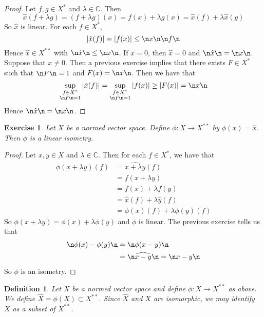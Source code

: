 \documentclass[12pt]{amsart}
\newtheorem{defn}[thm]{Definition}
\newtheorem{ex}[thm]{Exercise}
\newcommand{\lam}{\lambda}
\newcommand{\C}{\mathbb{C}}
\begin{document}
\begin{proof}
	Let $f,g \in X^*$ and $\lam \in \C$. Then $$\hat{x}(f+\lam g) = (f+ \lam g)(x) = f(x) + \lam g(x) = \hat{x}(f) + \lam \hat{x}(g)$$
	So $\hat{x}$ is linear. For each $f \in X^*$, $$\vert \hat{x}(f) \vert = \vert f(x) \vert \leq \n x \n \n f \n $$ Hence $\hat{x} \in X^{**}$ with $\n \hat{x} \n \leq \n x \n$. If $x=0$, then $\hat{x} = 0$ and $\n \hat{x} \n = \n x \n$. Suppose that $x \neq 0$. Then a previous exercise implies that there exists $F \in X^*$ such that $\n F \n =1$ and $F(x) = \n x \n$. Then we have that $$\sup_{\substack{f \in X^* \\ \n f \n = 1 } } \vert \hat{x}(f) \vert  = \sup_{\substack{f \in X^* \\ \n f \n = 1 }}  \vert f(x) \vert \geq \vert F(x) \vert = \n x \n$$
	Hence $\n \hat{x} \n = \n x \n$.
\end{proof}


\begin{ex}
	Let $X$ be a normed vector space. Define $\phi : X \rightarrow X^{**}$ by $\phi(x) = \hat{x}$. Then $\phi$ is a linear isometry. 
\end{ex}

\begin{proof}
	Let $x,y \in X$ and $\lam \in \C$. Then for each $f \in X^*$, we have that 
	\begin{align*}
		\phi(x+ \lam y)(f) 
		&= \widehat{x+ \lam y}(f) \\
		&= f(x+\lam y) \\
		&= f(x) + \lam f(y) \\
		&= \hat{x}(f) + \lam \hat{y}(f)\\
		&= \phi(x)(f) + \lam \phi(y)(f)
	\end{align*} 
	So $\phi(x+ \lam y) = \phi(x) + \lam \phi(y)$ and $\phi$ is linear. The previous exercise tells us that 
	\begin{align*}
		\n \phi(x) - \phi(y) \n 
		&= \n \phi(x-y)\n \\
		&= \n \widehat{x-y} \n = \n x-y \n
	\end{align*}
	So $\phi$ is an isometry.
\end{proof}

\begin{defn}
	Let $X$ be a normed vector space and define $\phi:X \rightarrow X^{**}$ as above. We define $\widehat{X} = \phi(X) \subset X^{**}$. Since $\widehat{X}$ and $X$ are isomorphic, we may identify $X$ as a subset of $X^{**}$. 
\end{defn}
\end{document}
